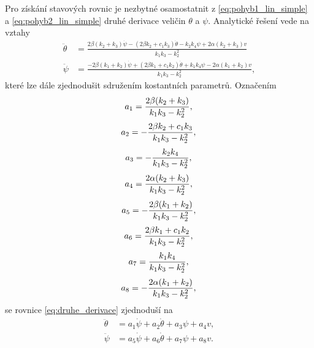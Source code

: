 \documentclass[conference]{IEEEtran}
\begin{document}
Pro získání stavových rovnic je nezbytné osamostatnit z \eqref{eq:pohyb1_lin_simple} a \eqref{eq:pohyb2_lin_simple}
druhé derivace veličin $\theta$ a $\psi$. Analytické řešení vede na vztahy
\begin{equation}
    \begin{split}
        \ddot{\theta} & = \frac{2\beta (k_2 + k_3) \dot{\psi}  - (2 \beta k_2 + c_1 k_3) \dot{\theta} - k_2 k_4 \psi + 2 \alpha (k_2 + k_3) v}{k_1 k_3 - k_2^2} \\
        \ddot{\psi} &= \frac{- 2 \beta (k_1 + k_2) \dot{\psi} + (2 \beta k_1 + c_1 k_2)\dot{\theta}  + k_1 k_4 \psi - 2 \alpha (k_1 + k_2) v}{k_1 k_3 - k_2^2},
        \label{eq:druhe_derivace}
    \end{split}
\end{equation}
které lze dále zjednodušit sdružením kostantních parametrů. Označením
\begin{equation*}
    a_1 = \frac{2\beta (k_2 + k_3)}{k_1 k_3 - k_2^2}, \\
\end{equation*}
\begin{equation*}
    a_2 = -\frac{2 \beta k_2 + c_1 k_3}{k_1 k_3 - k_2^2}, \\
\end{equation*}
\begin{equation*}
    a_3 = -\frac{k_2 k_4}{k_1 k_3 - k_2^2}, \\
\end{equation*}
\begin{equation*}
    a_4 = \frac{2 \alpha (k_2 + k_3)}{k_1 k_3 - k_2^2}, \\
\end{equation*}
\begin{equation*}
    a_5 = -\frac{2 \beta (k_1 + k_2)}{k_1 k_3 - k_2^2}, \\
\end{equation*}
\begin{equation*}
    a_6 = \frac{2 \beta k_1 + c_1 k_2}{k_1 k_3 - k_2^2}, \\
\end{equation*}
\begin{equation*}
    a_7 = \frac{ k_1 k_4 }{k_1 k_3 - k_2^2}, \\
\end{equation*}
\begin{equation*}
    a_8 = -\frac{2 \alpha (k_1 + k_2)}{k_1 k_3 - k_2^2}, \\
\end{equation*}
se rovnice \eqref{eq:druhe_derivace} zjednoduší na
\begin{equation}
    \begin{split}
        \ddot{\theta} & = a_1 \dot{\psi} + a_2  \dot{\theta} + a_3  \psi + a_4  v, \\
        \ddot{\psi} &= a_5  \dot{\psi} + a_6  \dot {\theta} + a_7  \psi + a_8  v.
        \label{eq:druhe_derivace_easy}
    \end{split}
\end{equation}
\end{document}
